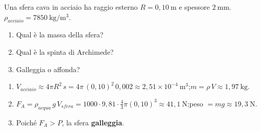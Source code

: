 \begin{question}[ID=3.1, subtitle={Sfera cava in acciaio immersa in acqua}, tags={fluidi, Archimede, galleggiamento}, difficulty=media]
Una sfera cava in acciaio ha raggio esterno $R = 0{,}10\ \mathrm{m}$ e spessore $2\ \mathrm{mm}$. $\rho_{acciaio} = 7850\ \mathrm{kg/m^3}$.
\begin{enumerate}
    \item Qual è la massa della sfera?
    \item Qual è la spinta di Archimede?
    \item Galleggia o affonda?
\end{enumerate}
\begin{solution}
\begin{enumerate}
    \item $V_{acciaio} \approx 4\pi R^2\,s = 4\pi\,(0{,}10)^2\,0{,}002 \approx 2{,}51\times10^{-4}\ \mathrm{m^3}$;\quad $m = \rho\,V \approx 1{,}97\ \mathrm{kg}$.
    \item $F_A = \rho_{acqua}\,g\,V_{sfera} = 1000\cdot9{,}81\cdot\tfrac{4}{3}\pi(0{,}10)^3 \approx 41{,}1\ \mathrm{N}$;\quad peso $= mg \approx 19{,}3\ \mathrm{N}$.
    \item Poiché $F_A > P$, la sfera \textbf{galleggia}.
\end{enumerate}
\end{solution}
\end{question}


